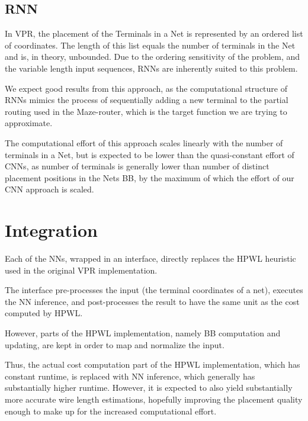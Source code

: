 \subsection{\gls{RNN}}

In \gls{VPR}, the placement of the Terminals in a Net is represented by an ordered list of coordinates. The length of this list equals the number of terminals in the Net and is, in theory, unbounded. Due to the ordering sensitivity of the problem, and the variable length input sequences, \glspl{RNN} are inherently suited to this problem.

We expect good results from this approach, as the computational structure of \glspl{RNN} mimics the process of sequentially adding a new terminal to the partial routing used in the Maze-router, which is the target function we are trying to approximate.

The computational effort of this approach scales linearly with the number of terminals in a Net, but is expected to be lower than the quasi-constant effort of \glspl{CNN}, as number of terminals is generally lower than number of distinct placement positions in the Nets \gls{BB}, by the maximum of which the effort of our CNN approach is scaled.

\section{Integration}

Each of the \glspl{NN}, wrapped in an interface, directly replaces the \gls{HPWL} heuristic used in the original \gls{VPR} implementation.

The interface pre-processes the input (the terminal coordinates of a net), executes the \gls{NN} inference, and post-processes the result to have the same unit as the cost computed by \gls{HPWL}.

However, parts of the \gls{HPWL} implementation, namely \gls{BB} computation and updating, are kept in order to map and normalize the input.

Thus, the actual cost computation part of the \gls{HPWL} implementation, which has constant runtime, is replaced with \gls{NN} inference, which generally has substantially higher runtime. However, it is expected to also yield substantially more accurate wire length estimations, hopefully improving the placement quality enough to make up for the increased computational effort.


